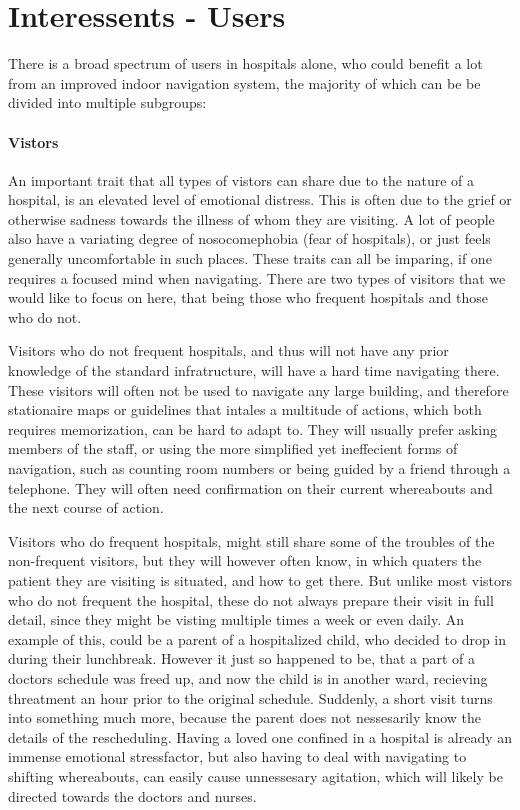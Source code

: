 \section{Interessents - Users} %
\label{sec:interusers}



There is a broad spectrum of users in hospitals alone, who could benefit a lot from an improved indoor navigation system, the majority of which can be be divided into multiple subgroups:

\paragraph{Vistors} %
 \label{par:vistors}
 

An important trait that all types of vistors can share due to the nature of a hospital, is an elevated level of emotional distress. This is often due to the grief or otherwise sadness towards the illness of whom they are visiting. A lot of people also have a variating degree of nosocomephobia (fear of hospitals), or just feels generally uncomfortable in such places. These traits can all be imparing, if one requires a focused mind when navigating. There are two types of visitors that we would like to focus on here, that being those who frequent hospitals and those who do not.

Visitors who do not frequent hospitals, and thus will not have any prior knowledge of the standard infratructure, will have a hard time navigating there. These visitors will often not be used to navigate any large building, and therefore stationaire maps or guidelines that intales a multitude of actions, which both requires memorization, can be hard to adapt to. They will usually prefer asking members of the staff, or using the more simplified yet ineffecient forms of navigation, such as counting room numbers or being guided by a friend through a telephone. They will often need confirmation on their current whereabouts and the next course of action.

Visitors who do frequent hospitals, might still share some of the troubles of the non-frequent visitors, but they will however often know, in which quaters the patient they are visiting is situated, and how to get there. But unlike most vistors who do not frequent the hospital, these do not always prepare their visit in full detail, since they might be visting multiple times a week or even daily. An example of this, could be a parent of a hospitalized child, who decided to drop in during their lunchbreak. However it just so happened to be, that a part of a doctors schedule was freed up, and now the child is in another ward, recieving threatment an hour prior to the original schedule. Suddenly, a short visit turns into something much more, because the parent does not nessesarily know the details of the rescheduling. Having a loved one confined in a hospital is already an immense emotional stressfactor, but also having to deal with navigating to shifting whereabouts, can easily cause unnessesary agitation, which will likely be directed towards the doctors and nurses.

